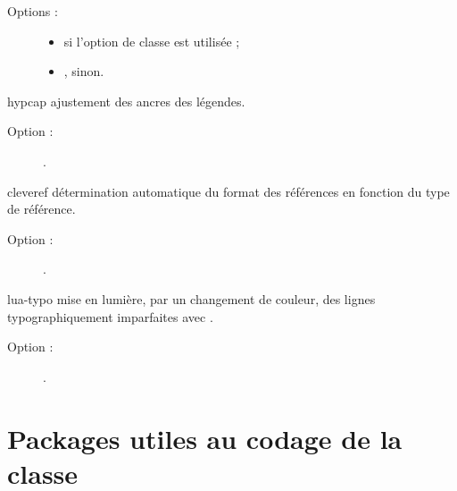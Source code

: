 \documentclass{letgut}
\begin{document}
\begin{ctannews}
\begin{description}
  \item[Options :]\leavevmode{}
    \begin{itemize}
    \item {} si l'option de classe  est utilisée ;
    \item {}, 
      sinon.
    \end{itemize}
  \end{description}
\item[hypcap] ajustement des ancres des légendes.
  \begin{description}
  \item[Option :] .
  \end{description}
\item[cleveref] détermination automatique du format des références en fonction
  du type de référence.
  \begin{description}
  \item[Option :] .
  \end{description}
\item[lua-typo] mise en lumière, par un changement de couleur, des lignes
  typographiquement imparfaites avec .
  \begin{description}
  \item[Option :] .
  \end{description}
\end{ctannews}

\section{Packages utiles au codage de la classe }
\label{sec:utiles-au-codage}
\end{document}
